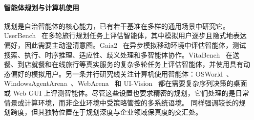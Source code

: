 \paragraph{智能体规划与计算机使用}
规划是自治智能体的核心能力，已有若干基准在多样的通用场景中研究它。UserBench~\citep{qian2025userbenchinteractivegymenvironment} 在多轮旅行规划任务上评估智能体，其中模拟用户逐步且隐式地表达偏好，因此需要主动澄清意图。Gaia2~\citep{froger2025arescalingagentenvironments} 在异步模拟移动环境中评估智能体，测试搜索、执行、时序推理、适应性、歧义处理和多智能体协作。VitaBench~\citep{he2025vitabenchbenchmarkingllmagents} 在送餐、到店就餐和在线旅行等真实服务的复杂多轮任务上评估智能体，并使用具有动态偏好的模拟用户。另一条并行研究线关注计算机使用智能体：OSWorld~\citep{xie2024osworld}、WindowsAgentArena~\citep{bonatti2024arena}、WebArena~\citep{zhou2024webarenarealisticwebenvironment} 和 UI-Vision~\citep{nayak2025uivisiondesktopcentricguibenchmark} 都在需要复杂序列决策的桌面或 Web GUI 上评测智能体。尽管这些设置也要求精密的规划，它们处理的是日常情景或计算环境，而非企业环境中受策略管控的多系统语境。\ours{} 同样强调较长的规划跨度，但其独特位置在于规划深度与企业领域保真度的交汇处。
